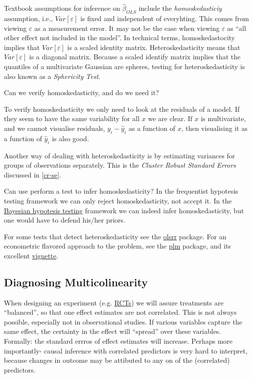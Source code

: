 \documentclass[]{book}
\theoremstyle{definition}
\theoremstyle{definition}
\theoremstyle{definition}
\theoremstyle{remark}
\begin{document}
Textbook assumptions for inference on \(\hat \beta_{OLS}\) include the
\emph{homoskedasticiy} assumption, i.e., \(Var[\varepsilon]\) is fixed
and independent of everyhting. This comes from viewing \(\varepsilon\)
as a measurement error. It may not be the case when viewing
\(\varepsilon\) as ``all other effect not included in the model''. In
technical terms, homoskedastocity implies that \(Var[\varepsilon]\) is a
scaled identity matrix. Heteroskedasticity means that
\(Var[\varepsilon]\) is a diagonal matrix. Because a scaled identify
matrix implies that the quantiles of a multivariate Gaussian are
spheres, testing for heteroskedasticity is also known as a
\emph{Sphericity Test}.

Can we verify homoskedasticity, and do we need it?

To verify homoskedasticity we only need to look at the residuals of a
model. If they seem to have the same variability for all \(x\) we are
clear. If \(x\) is multivariate, and we cannot visualise residuals,
\(y_i-\hat y_i\) as a function of \(x\), then visualising it as a
function of \(\hat y_i\) is also good.

Another way of dealing with heteroskedasticity is by estimating
variances for groups of observations separately. This is the
\emph{Cluster Robust Standard Errors} discussed in \ref{cr-se}.

Can use perform a test to infer homoskedasticity? In the frequentist
hypotesis testing framework we can only reject homoskedasticity, not
accept it. In the
\href{https://en.wikipedia.org/wiki/Bayesian_inference}{Bayesian
hypotesis testing} framework we can indeed infer homoskedasticity, but
one would have to defend his/her priors.

For some tests that detect heteroskedasticity see the
\href{https://cran.r-project.org/web/packages/olsrr/vignettes/heteroskedasticity.html}{olsrr}
package. For an econometric flavored approach to the problem, see the
\href{https://cran.r-project.org/package=plm}{plm} package, and its
excellent
\href{https://cran.r-project.org/web/packages/plm/vignettes/plmPackage.html}{vignette}.

\subsection{Diagnosing
Multicolinearity}\label{diagnosing-multicolinearity}

When designing an experiment (e.g.
\href{https://en.wikipedia.org/wiki/Randomized_controlled_trial}{RCTs})
we will assure treatments are ``balanced'', so that one effect estimates
are not correlated. This is not always possible, especially not in
observational studies. If various variables capture the same effect, the
certainty in the effect will ``spread'' over these variables. Formally:
the standard errros of effect estimates will increase. Perhaps more
importantly- causal inference with correlated predictors is very hard to
interpret, because changes in outcome may be attibuted to any on of the
(correlated) predictors.
\end{document}
